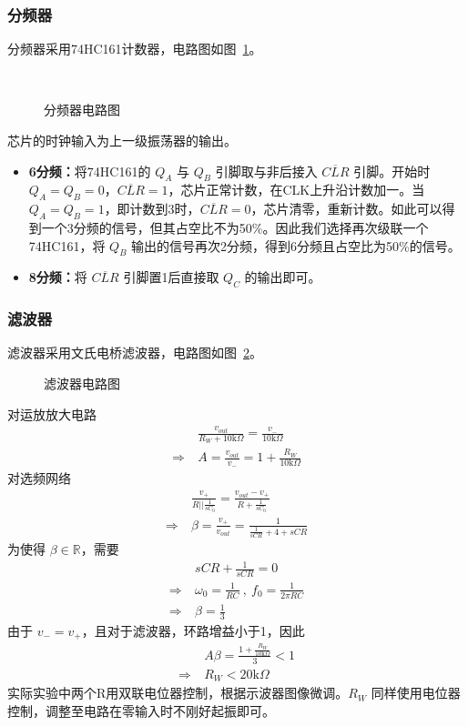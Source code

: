 \documentclass[utf8,twocolumn]{article}
\begin{document}
\subsubsection{分频器}
分频器采用74HC161计数器，电路图如图~\ref{circ:freq-divider}。
\begin{figure}[H]
\centering
\subfigure[6分频]{
    \scalebox{0.5}{
        
    }
}
\\
\subfigure[8分频]{
    \scalebox{0.5}{
        
    }
}
\caption{分频器电路图}
\label{circ:freq-divider}
\end{figure}
芯片的时钟输入为上一级振荡器的输出。
\begin{itemize}
    \item \textbf{6分频：}将74HC161的 $ Q_A $ 与 $ Q_B $ 引脚取与非后接入 $ \overline{CLR} $ 引脚。开始时 $ Q_A = Q_B = 0 $，$ \overline{CLR} = 1 $，芯片正常计数，在CLK上升沿计数加一。当 $ Q_A = Q_B = 1 $，即计数到3时，$ \overline{CLR} = 0 $，芯片清零，重新计数。如此可以得到一个3分频的信号，但其占空比不为50\%。因此我们选择再次级联一个74HC161，将 $ Q_B $ 输出的信号再次2分频，得到6分频且占空比为50\%的信号。
    \item \textbf{8分频：}将 $ \overline{CLR} $ 引脚置1后直接取 $ Q_C $ 的输出即可。
\end{itemize}

\subsubsection{滤波器}
滤波器采用文氏电桥滤波器，电路图如图~\ref{circ:filter}。
\begin{figure}[H]
\centering
\scalebox{0.8}{
    
}
\caption{滤波器电路图}
\label{circ:filter}
\end{figure}
对运放放大电路
\begin{align}
    &\frac{v_{out}}{R_W + 10\mathrm{k}\Omega} = \frac{v_-}{10\mathrm{k}\Omega} \\
    \Rightarrow ~ &A = \frac{v_{out}}{v_-} = 1 + \frac{R_W}{10\mathrm{k}\Omega}
\end{align}
对选频网络
\begin{align}
    &\frac{v_+}{R || \frac{1}{sC_0}} = \frac{v_{out} - v_+}{R + \frac{1}{sC_0}} \\
    \Rightarrow ~ &\beta = \frac{v_+}{v_{out}} = \frac{1}{\frac{1}{sCR} + 4 + sCR}
\end{align}
为使得 $ \beta \in \mathbb{R} $，需要
\begin{align}
    &sCR + \frac{1}{sCR} = 0 \\
    \Rightarrow ~ &\omega_0 = \frac{1}{RC} ~ , ~ f_0 = \frac{1}{2\pi RC} \\
    \Rightarrow ~ &\beta = \frac{1}{3}
\end{align}
由于 $ v_- = v_+ $，且对于滤波器，环路增益小于1，因此
\begin{align}
    &A\beta = \frac{1 + \frac{R_W}{10\mathrm{k}\Omega}}{3} < 1 \\
    \Rightarrow ~ &R_W < 20\mathrm{k}\Omega
\end{align}
实际实验中两个R用双联电位器控制，根据示波器图像微调。$ R_W $ 同样使用电位器控制，调整至电路在零输入时不刚好起振即可。
\end{document}
